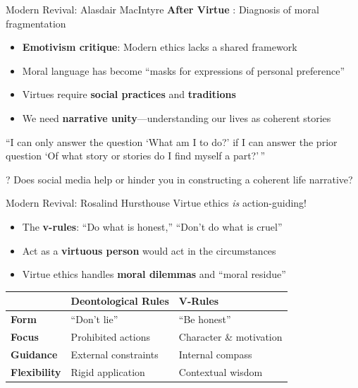\documentclass[aspectratio=169]{beamer}
\begin{document}
\begin{frame}{Modern Revival: Alasdair MacIntyre}
\textbf{After Virtue} \parencite{macintyre_after_virtue}: Diagnosis of moral fragmentation

\begin{itemize}
    \item \textbf{Emotivism critique}: Modern ethics lacks a shared framework
    \item Moral language has become ``masks for expressions of personal preference''
    \item Virtues require \textbf{social practices} and \textbf{traditions}
    \item We need \textbf{narrative unity}---understanding our lives as coherent stories
\end{itemize}

\vspace{0.3cm}
\begin{quotebox}
``I can only answer the question `What am I to do?' if I can answer the prior question `Of what story or stories do I find myself a part?'\,''
\end{quotebox}

\begin{alertblock}{?}
Does social media help or hinder you in constructing a coherent life narrative?
\end{alertblock}
\end{frame}

\begin{frame}{Modern Revival: Rosalind Hursthouse}
Virtue ethics \textit{is} action-guiding!

\begin{itemize}
    \item The \textbf{v-rules}: ``Do what is honest,'' ``Don't do what is cruel''
    \item Act as a \textbf{virtuous person} would act in the circumstances
    \item Virtue ethics handles \textbf{moral dilemmas} and ``moral residue''
\end{itemize}

\vspace{0.3cm}
\begin{table}[h]
\centering
\small
\begin{tabular}{>{\bfseries}l l l}
\toprule
& \textbf{Deontological Rules} & \textbf{V-Rules} \\
\midrule
Form & ``Don't lie'' & ``Be honest'' \\
Focus & Prohibited actions & Character \& motivation \\
Guidance & External constraints & Internal compass \\
Flexibility & Rigid application & Contextual wisdom \\
\bottomrule
\end{tabular}
\end{table}
\end{frame}
\end{document}
